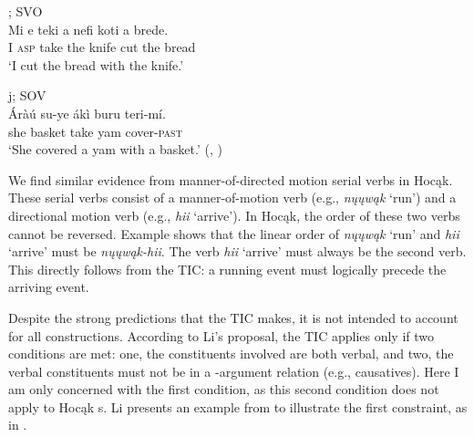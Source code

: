 \documentclass[output=paper]{LSP/langsci}
\begin{document}
\ea\label{ex:rosen:35}
\ea
{}; SVO\\
\gll Mi e teki a nefi koti a brede. \\
I \textsc{asp} take the knife cut the bread \\
\glt `I cut the bread with the knife.'

\ex 
{}j; SOV\\
 \gll \'Aràú su-ye ákì buru teri-mí. \\
she basket take yam cover-\textsc{past}\\
\glt `She covered a yam with a basket.' (\citealt[500]{Li1993}, )
\z
\z

We find similar evidence from manner-of-directed motion serial verbs in Ho\-cąk. These serial verbs consist of a manner-of-motion verb (e.g., \textit{nųųwąk} `run') and a directional motion verb (e.g., \textit{hii} `arrive'). In Hocąk, the order of these two verbs cannot be reversed. Example  shows that the linear order of \textit{nųųwąk} `run' and \textit{hii} `arrive' must be \textit{nųųwąk-hii}. The verb \textit{hii} `arrive' must always be the second verb. This directly follows from the TIC: a running event must logically precede the arriving event.

\let\eachwordtwo=\itshape
\begin{exe}
\ex\label{ex:rosen:36}
\begin{xlist}



\end{xlist}
\end{exe}

 
Despite the strong predictions that the TIC makes, it is not intended to account for all  constructions. According to Li's proposal, the TIC applies only if two conditions are met: one, the constituents involved are both verbal, and two, the verbal constituents must not be in a -argument relation (e.g., causatives). Here I am only concerned with the first condition, as this second condition does not apply to Hocąk s. Li presents an example from  to illustrate the first constraint, as in .
 
\end{document}
